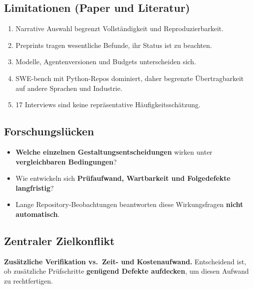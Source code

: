 \documentclass[12pt,a4paper]{article}
\begin{document}
\subsection{Limitationen (Paper und Literatur)}
\begin{enumerate}
  \item Narrative Auswahl begrenzt Vollständigkeit und Reproduzierbarkeit.
  \item Preprints tragen wesentliche Befunde, ihr Status ist zu beachten.
  \item Modelle, Agentenversionen und Budgets unterscheiden sich.
  \item SWE-bench mit Python-Repos dominiert, daher begrenzte Übertragbarkeit auf andere Sprachen und Industrie.
  \item 17 Interviews sind keine repräsentative Häufigkeitsschätzung.
\end{enumerate}

\subsection{Forschungslücken}
\begin{itemize}
  \item \textbf{Welche einzelnen Gestaltungsentscheidungen} wirken unter \textbf{vergleichbaren Bedingungen}?
  \item Wie entwickeln sich \textbf{Prüfaufwand, Wartbarkeit und Folgedefekte langfristig}?
  \item Lange Repository-Beobachtungen beantworten diese Wirkungsfragen \textbf{nicht automatisch}.
\end{itemize}

\subsection{Zentraler Zielkonflikt}
\begin{merke}[Zielkonflikt]
\textbf{Zusätzliche Verifikation vs.\ Zeit- und Kostenaufwand.} Entscheidend ist, ob zusätzliche Prüfschritte \textbf{genügend Defekte aufdecken}, um diesen Aufwand zu rechtfertigen.
\end{merke}
\end{document}
